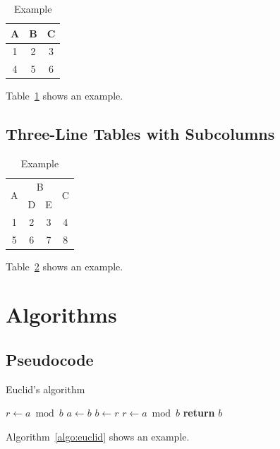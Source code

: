 \documentclass[letterpaper]{article}
\begin{document}
\begin{table}
    \centering
    \begin{tabular}{ccc}
        \toprule
        A & B & C \\
        \midrule
        1 & 2 & 3 \\
        4 & 5 & 6 \\
        \bottomrule
    \end{tabular}
    \caption{Example}
    \label{tab:three-line}
\end{table}

Table~\ref{tab:three-line} shows an example.



\subsection{Three-Line Tables with Subcolumns}

\begin{table}[t]
    \centering
    \begin{tabular}{c c c c}
        \toprule
        \multirow{2}{*}{A} & \multicolumn{2}{c}{B} & \multirow{2}{*}{C}     \\
        \cmidrule{2-3}     & D                     & E                  &   \\
        \midrule
        1                  & 2                     & 3                  & 4 \\
        5                  & 6                     & 7                  & 8 \\
        \bottomrule
    \end{tabular}

    \caption{Example}
    \label{tab:subcolumns}
\end{table}

Table~\ref{tab:subcolumns} shows an example.

\section{Algorithms}


\subsection{Pseudocode}

\begin{algorithm}
    \caption{Euclid’s algorithm}
    \label{algo:euclid}
    \begin{algorithmic}[1]
        \State $r\gets a\bmod b$
        \State $a\gets b$
        \State $b\gets r$
        \State $r\gets a\bmod b$
        \EndWhile
        \State \textbf{return} $b$
        \EndProcedure
    \end{algorithmic}
\end{algorithm}

Algorithm~\ref{algo:euclid} shows an example.
\end{document}
